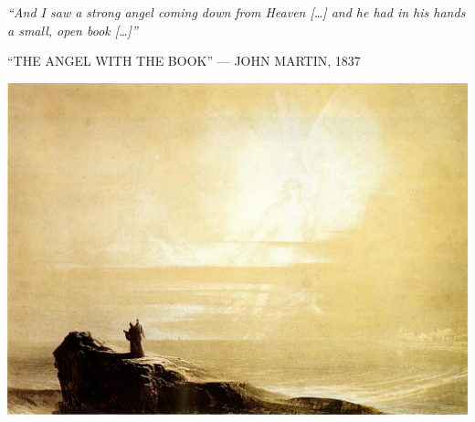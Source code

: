 \clearpage
\thispagestyle{empty}
\null\vfill
\settowidth{}
\begin{center}
\parbox{\longest}{%
  \raggedright{\huge\itshape%
    ``And I saw a strong angel coming down from Heaven […] and he had in his hands a small, open book […]'' \par\bigskip
  }
  \raggedleft\Large\MakeUppercase{``The Angel with the Book'' — John Martin, 1837}\par%
}
\vfill\vfill
\clearpage\newpage
\end{center}
\newpage
\thispagestyle{empty}
\begin{center}
	\includegraphics[angle=90, width=1\textwidth]{images/illustrations/johnmartinangelbook}
\end{center}